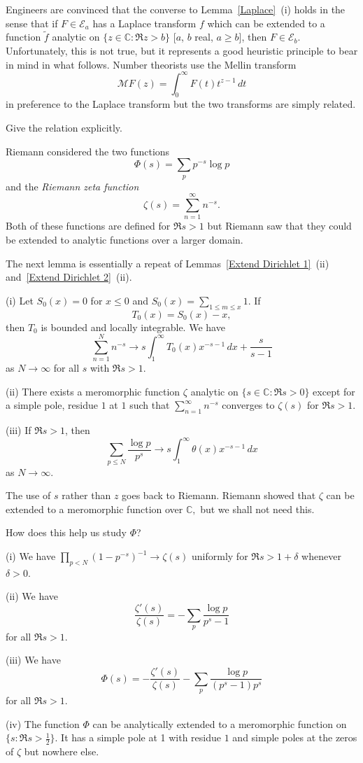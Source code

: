 Engineers are convinced that the converse to
Lemma~\ref{Laplace}~(i) holds in the sense that if
$F\in {\mathcal E}_{a}$ has a Laplace transform $f$
which can be extended to a function $\tilde{f}$
analytic on $\{z\in{\mathbb C}:\Re z>b\}$
[$a$, $b$ real, $a\geq b$], then $F\in {\mathcal E}_{b}$.
Unfortunately, this is not true, but it represents
a good heuristic principle to bear in mind in what follows.
Number theorists use the Mellin transform
\[{\mathcal M}F(z)=\int_{0}^{\infty}F(t)t^{z-1}\,dt\]
in preference to the Laplace transform but the
two transforms are simply related.
\begin{exercise} Give the relation explicitly.
\end{exercise}

Riemann considered the two functions
\[\Phi(s)=\sum_{p}p^{-s}\log p\]
and the \emph{Riemann zeta function}
\[\zeta(s)=\sum_{n=1}^{\infty}n^{-s}.\]
Both of these functions are defined for $\Re s>1$
but Riemann saw that they could be extended
to analytic functions over a larger domain.

The next lemma is essentially a repeat of
Lemmas~\ref{Extend Dirichlet 1}~(ii)
and~\ref{Extend Dirichlet 2}~(ii).
\begin{lemma}
(i) Let $S_{0}(x)=0$ for $x\leq 0$ and
$S_{0}(x)=\sum_{1\leq m\leq x}1$. If
\[T_{0}(x)=S_{0}(x)-x,\]
then $T_{0}$ is bounded
and locally integrable. We have
\[\sum_{n=1}^{N}n^{-s}\rightarrow
s\int_{1}^{\infty}T_{0}(x)x^{-s-1}\, dx+\frac{s}{s-1}\]
as $N\rightarrow\infty$ for all $s$ with $\Re s>1$.

(ii) There exists a meromorphic function $\zeta$
analytic on $\{s\in{\mathbb C}:\Re s>0\}$ except for
a simple pole, residue $1$ at $1$ such that
$\sum_{n=1}^{\infty}n^{-s}$ converges to
$\zeta(s)$ for $\Re s>1$.

(iii) If $\Re s>1$, then
\[\sum_{p\leq N}\frac{\log p}{p^{s}}
\rightarrow
s\int_{1}^{\infty}\theta(x)x^{-s-1}\, dx\]
as $N\rightarrow\infty$.
\end{lemma}
The use of $s$ rather than $z$ goes back to Riemann.
Riemann showed that $\zeta$ can be extended to a meromorphic
function over ${\mathbb C},$ but we shall not need this.

How does this help us study $\Phi$?
\begin{lemma}\label{extend half}
(i) We have $\prod_{p<N}(1-p^{-s})^{-1}\rightarrow \zeta(s)$
uniformly for $\Re s>1+\delta$ whenever $\delta>0$.

(ii) We have
\[\frac{\zeta'(s)}{\zeta(s)}=-\sum_{p}\frac{\log p}{p^{s}-1}\]
for all $\Re s>1$.

(iii) We have
\[\Phi(s)=-\frac{\zeta'(s)}{\zeta(s)}-
\sum_{p}\frac{\log p}{(p^{s}-1)p^{s}}\]
for all $\Re s>1$.

(iv) The function $\Phi$ can be analytically extended
to a meromorphic function on
$\{s:\Re s>\frac{1}{2}\}$. It has a simple pole at 1
with residue $1$ and simple poles at the zeros of
$\zeta$ but nowhere else.
\end{lemma}


